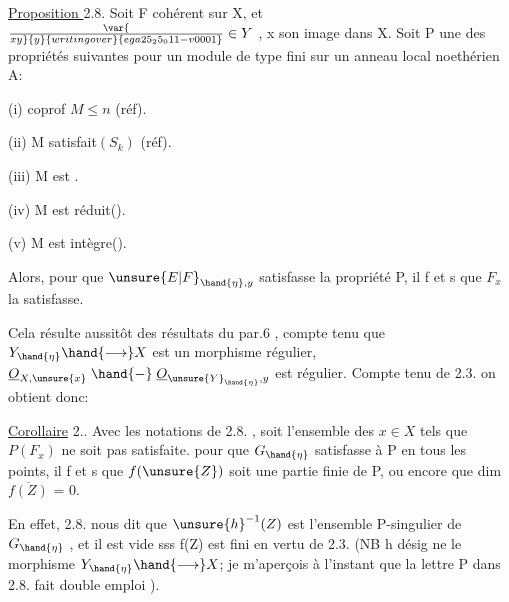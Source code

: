 
\uline{Proposition }2.8.  Soit F cohérent sur X, et  $\var{\over{x}{y}}{y}{writing over}{ega25_25_011-v0001}\in Y$ , x son image
dans X.   Soit P une des propriétés suivantes pour
un module de type fini sur un anneau local noethérien A:

(i)   coprof $M\leqslant n$   (réf).

(ii)  M satisfait$(S_k)$  (réf).

(iii)  M est .

(iv)  M est réduit().

(v)   M est intègre().

Alors, pour que $\unsure{E|F}_{\hand{\eta},y}$ satisfasse la propriété P, il f et s que $F_x$ la
satisfasse.

Cela résulte aussitôt des résultats du par.6 , compte tenu que
 $Y_{\hand{\eta}}\hand{\longrightarrow} X$  est un morphisme régulier,   $\underline{O}_{X,\unsure{x}}\mathrel{\hand{-}} \underline{O}_{\unsure{Y}_{\hand{\eta}},y}$ est
régulier.  Compte tenu de 2.3. on obtient donc:

\uline{Corollaire} 2..  Avec les notations de 2.8. , soit  l'ensemble
des $x\in X$ tels que $P(F_x)$ ne soit pas satisfaite.  pour que
$G_{\hand{\eta}}$ satisfasse à P en tous les points, il f et s que $f(\unsure{Z})$ soit une
partie finie de P, ou encore que  dim $\overline{f(Z)}$ = 0.

En effet, 2.8. nous dit que $\unsure{h}^{-1}(Z)$ est l'ensemble P-singulier
de $G_{\hand{\eta}}$ , et il est vide sss f(Z) est fini en vertu de 2.3. (NB h désig
 ne le morphisme $Y_{\hand{\eta}}\hand{\longrightarrow} X$; je m'aperçois à l'instant que la lettre P
 dans 2.8. fait double emploi ).

